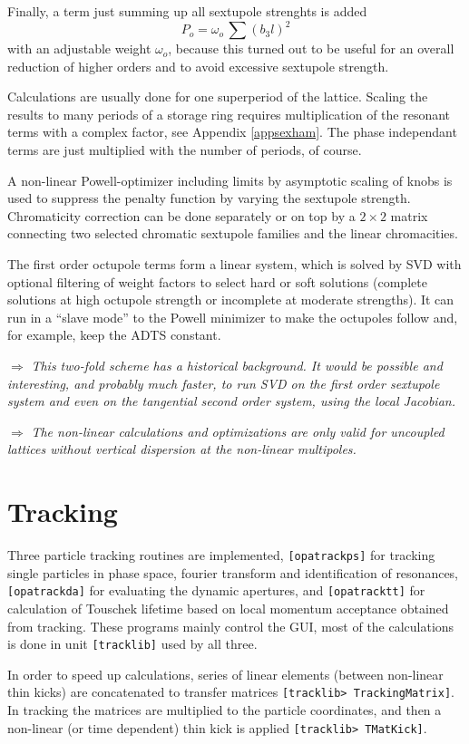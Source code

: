 \documentclass[12pt]{article}
\newcommand\todo[1]{$\Longrightarrow$ {\em #1} }
\newcommand\code[1]{{\tt [#1]}}
\begin{document}
Finally, a term just summing up all sextupole strenghts is added
\[
P_o= \omega_o \, \sum (b_3l)^2
\]
with an adjustable weight $\omega_o$, because this turned out to be useful for an overall reduction of higher orders and to avoid excessive sextupole strength.

Calculations are usually done for one superperiod of the lattice. Scaling the results to many periods of a storage ring requires multiplication of the resonant terms with a complex factor, see Appendix \ref{appsexham}. The phase independant terms are just multiplied with the number of periods, of course.

A non-linear Powell-optimizer \cite{numrec} including limits by asymptotic scaling of knobs is used to suppress the penalty function by varying the sextupole strength.
Chromaticity correction can be done separately or on top by a $2\times 2$ matrix connecting two selected chromatic sextupole families and the linear chromacities.

The first order octupole terms form a linear system, which is solved by SVD \cite{numrec} with optional filtering of weight factors to select hard or soft solutions (complete solutions at high octupole strength or incomplete at moderate strengths). It can run in a ``slave mode'' to the Powell minimizer to make the octupoles follow and, for example, keep the ADTS constant.

\todo{This two-fold scheme has a historical background. It would be possible and interesting, and probably much faster, to run SVD on the first order sextupole system and even on the tangential second order system, using the local Jacobian.}

\todo{The non-linear calculations and optimizations are only valid for uncoupled lattices without vertical dispersion at the non-linear multipoles.}


\section{Tracking}
Three particle tracking routines are implemented, \code{opatrackps} for tracking single particles in phase space, fourier transform and identification of resonances, \code{opatrackda} for evaluating the dynamic apertures, and \code{opatracktt} for calculation of Touschek lifetime based on local momentum acceptance obtained from tracking. These programs mainly control the GUI, most of the calculations is done in unit \code{tracklib} used by all three.

In order to speed up calculations, series of linear elements (between non-linear thin kicks) are concatenated to transfer matrices \code{tracklib> TrackingMatrix}. In tracking the matrices are multiplied to the particle coordinates, and then a non-linear (or time dependent) thin kick is applied \code{tracklib> TMatKick}.
\end{document}
